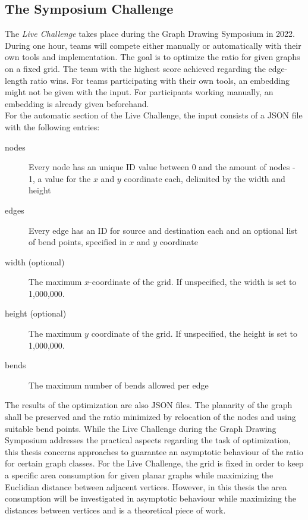 
\subsection{The Symposium Challenge}

The \emph{Live Challenge} takes place during the Graph Drawing Symposium in 2022. During one hour, teams will compete either manually or automatically with their own tools and implementation. The goal is to optimize the ratio for given graphs on a fixed grid. The team with the highest score achieved regarding the edge-length ratio wins. For teams participating with their own tools, an embedding might not be given with the input. For participants working manually, an embedding is already given beforehand.
\\
For the automatic section of the Live Challenge, the input consists of a JSON file with the following entries:
\begin{description}
	\item[nodes] Every node has an unique ID value between 0 and the amount of nodes - 1, a value for the $x$ and $y$ coordinate each, delimited by the width and height
	\item[edges] Every edge has an ID for source and destination each and an optional list of bend points, specified in $x$ and $y$ coordinate
	\item[width (optional)] The maximum $x$-coordinate of the grid. If unspecified, the width is set to 1,000,000.
	\item[height (optional)] The maximum $y$ coordinate of the grid. If unspecified, the height is set to 1,000,000.
	\item[bends] The maximum number of bends allowed per edge
\end{description}
The results of the optimization are also JSON files. The planarity of the graph shall be preserved and the ratio minimized by relocation of the nodes and using suitable bend points.
\bigskip
While the Live Challenge during the Graph Drawing Symposium addresses the practical aspects regarding the task of optimization, this thesis concerns approaches to guarantee an asymptotic behaviour of the ratio for certain graph classes. For the Live Challenge, the grid is fixed in order to keep a specific area consumption for given planar graphs while maximizing the Euclidian distance between adjacent vertices. However, in this thesis the area consumption will be investigated in asymptotic behaviour while maximizing the distances between vertices and is a theoretical piece of work.